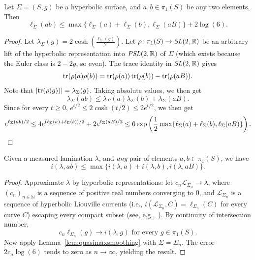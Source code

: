 \begin{lemma}\label{lem:quasimaxsmoothing}
    Let $\Sigma = (S,g)$ be a hyperbolic surface, and $a,b \in \pi_1(S)$ be any two elements. Then
    \[
    \ell_\Sigma(ab) \le \max \{\ell_\Sigma(a) + \ell_\Sigma(b), \ell_\Sigma(aB)\} + 2 \log(6).
    \]
\end{lemma}
\begin{proof}
Let $\lambda_\Sigma(g)=2\cosh\left(\frac{\ell_\Sigma(g)}{2}\right)$.
Let $\rho \colon \pi_1(S) \to \operatorname{\mathit{SL}}(2,\mathbb{R})$ be an arbitrary lift of the hyperbolic representation into $\operatorname{\mathit{PSL}}(2,\mathbb{R})$ of $\Sigma$ (which exists because the Euler class is $2-2g$, so even).
The trace identity in $\operatorname{\mathit{SL}}(2,\mathbb{R})$ gives
\[
\operatorname{tr}(\rho(a)\rho(b))=\operatorname{tr}(\rho(a))\operatorname{tr}(\rho(b))-\operatorname{tr}(\rho(aB)). 
\]
Note that $\lvert\operatorname{tr}(\rho(g))\rvert = \lambda_\Sigma(g)$. Taking absolute values, we then get
\begin{equation*}
\lambda_\Sigma(ab) \leq \lambda_\Sigma(a)\lambda_\Sigma(b) + \lambda_\Sigma(aB).
\end{equation*}
Since for every $t\geq0$, $e^{t/2}\leq 2\cosh(t/2)\leq 2e^{t/2}$,
we then get
\[
e^{\ell_\Sigma(ab)/2} \leq 4e^{(\ell_\Sigma(a)+\ell_\Sigma(b))/2}+2e^{\ell_\Sigma(aB)/2}\leq 6\exp\left(\frac12 \max \{ \ell_\Sigma(a)+\ell_\Sigma(b),\ell_\Sigma(aB)\}\right).\qedhere
\]
\end{proof}

\begin{lemma}\label{lem:maxsmooth_ineq}
Given a measured lamination $\lambda$, and \emph{any} pair of elements $a,b \in \pi_1(S)$, we have
\begin{equation*}
i(\lambda,ab) \leq \max \{ i(\lambda, a) + i(\lambda, b), i(\lambda, aB) \}.
\end{equation*}
\end{lemma}
\begin{proof}
  Approximate $\lambda$ by hyperbolic representations:
let $c_n \mathcal{L}_{\Sigma_n} \to \lambda$, where $(c_n)_{n
  \in\mathbb N}$ is a sequence of positive real numbers converging to
$0$, and $\mathcal{L}_{\Sigma_n}$ is a sequence of hyperbolic
Liouville currents (i.e., $i(\mathcal{L}_{\Sigma_n},
C)=\ell_{\Sigma_n}(C)$ for every curve $C$) escaping every compact
subset (see, e.g.,~\cite[Page~152]{Bonahon88:GeodesicCurrent}).
By continuity of intersection number,
\begin{equation*} c_n \ell_{\Sigma_n}(g) \to i(\lambda, g) \text{ for every } g \in \pi_1(S).
\end{equation*}
Now apply Lemma~\ref{lem:quasimaxsmoothing} with $\Sigma=\Sigma_n$.
The error $2c_n\log(6)$
tends to zero as $n \to \infty$, yielding the result.
\end{proof}

